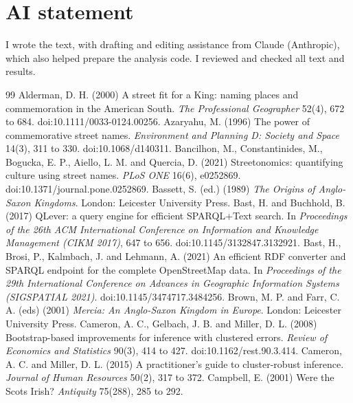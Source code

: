 \documentclass[11pt,a4paper]{article}
\begin{document}
\section*{AI statement}
I wrote the text, with drafting and editing assistance from Claude (Anthropic), which also helped prepare the analysis code. I reviewed and checked all text and results.

\begin{thebibliography}{99}
 Alderman, D. H. (2000) A street fit for a King: naming places and commemoration in the American South. \textit{The Professional Geographer} 52(4), 672 to 684. doi:10.1111/0033-0124.00256.
 Azaryahu, M. (1996) The power of commemorative street names. \textit{Environment and Planning D: Society and Space} 14(3), 311 to 330. doi:10.1068/d140311.
 Bancilhon, M., Constantinides, M., Bogucka, E. P., Aiello, L. M. and Quercia, D. (2021) Streetonomics: quantifying culture using street names. \textit{PLoS ONE} 16(6), e0252869. doi:10.1371/journal.pone.0252869.
 Bassett, S. (ed.) (1989) \textit{The Origins of Anglo-Saxon Kingdoms}. London: Leicester University Press.
 Bast, H. and Buchhold, B. (2017) QLever: a query engine for efficient SPARQL+Text search. In \textit{Proceedings of the 26th ACM International Conference on Information and Knowledge Management (CIKM 2017)}, 647 to 656. doi:10.1145/3132847.3132921.
 Bast, H., Brosi, P., Kalmbach, J. and Lehmann, A. (2021) An efficient RDF converter and SPARQL endpoint for the complete OpenStreetMap data. In \textit{Proceedings of the 29th International Conference on Advances in Geographic Information Systems (SIGSPATIAL 2021)}. doi:10.1145/3474717.3484256.
 Brown, M. P. and Farr, C. A. (eds) (2001) \textit{Mercia: An Anglo-Saxon Kingdom in Europe}. London: Leicester University Press.
 Cameron, A. C., Gelbach, J. B. and Miller, D. L. (2008) Bootstrap-based improvements for inference with clustered errors. \textit{Review of Economics and Statistics} 90(3), 414 to 427. doi:10.1162/rest.90.3.414.
 Cameron, A. C. and Miller, D. L. (2015) A practitioner's guide to cluster-robust inference. \textit{Journal of Human Resources} 50(2), 317 to 372.
 Campbell, E. (2001) Were the Scots Irish? \textit{Antiquity} 75(288), 285 to 292.

\end{thebibliography}
\end{document}

